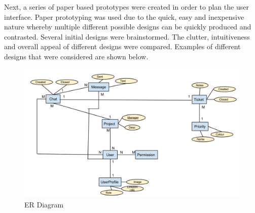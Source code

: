 \documentclass[a4paper]{l3proj}
\begin{document}
Next, a series of paper based prototypes were created in order to plan the user interface. Paper prototyping was used due to the quick, easy and inexpensive nature whereby multiple different possible designs can be quickly produced and contrasted. Several initial designs were brainstormed. The clutter, intuitiveness and overall appeal of different designs were compared.  Examples of different designs that were considered are shown below.

\begin{figure}
\centering
\includegraphics[scale=0.4]{ER_Diagram}
\caption{ER Diagram}
\label{figure:ERDiagram1}
\end{figure} 
\end{document}

